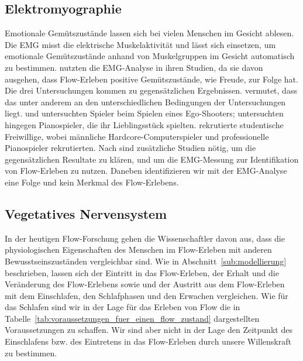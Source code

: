 \subsection{Elektromyographie}

Emotionale Gemütszustände lassen sich bei vielen Menschen im Gesicht ablesen. Die \ac{EMG} misst die elektrische Muskelaktivität und lässt sich einsetzen, um emotionale Gemütszustände anhand von Muskelgruppen im Gesicht automatisch zu bestimmen. \citet{Kivikangas2006, Nacke2008, deManzano2010} nutzten die \ac{EMG}-Analyse in ihren Studien, da sie davon ausgehen, dass Flow-Erleben positive Gemütszustände, wie Freude, zur Folge hat. Die drei Untersuchungen kommen zu gegensätzlichen Ergebnissen. \citet[vgl.][S.~153]{Peifer2012} vermutet, dass das unter anderem an den unterschiedlichen Bedingungen der Untersuchungen liegt. \citet{Kivikangas2006} und \citet{Nacke2008} untersuchten Spieler beim Spielen eines Ego-Shooters; \citet{deManzano2010} untersuchten hingegen Pianospieler, die ihr Lieblingsstück spielten. \citet{Kivikangas2006} rekrutierte studentische Freiwillige, wobei \citet{Nacke2008} männliche Hardcore-Computerspieler und \citet{deManzano2010} professionelle Pianospieler rekrutierten. Nach \citet[vgl.][S.~153]{Peifer2012} sind zusätzliche Studien nötig, um die gegensätzlichen Resultate zu klären, und um die \ac{EMG}-Messung zur Identifikation von Flow-Erleben zu nutzen. Daneben identifizieren wir mit der \ac{EMG}-Analyse eine Folge und kein Merkmal des Flow-Erlebens.

\subsection{Vegetatives Nervensystem}

In der heutigen Flow-Forschung gehen die Wissenschaftler davon aus, dass die physiologischen Eigenschaften des Menschen im Flow-Erleben mit anderen Bewusstseinszuständen vergleichbar sind. Wie in Abschnitt~\ref{sub:modellierung} beschrieben, lassen sich der Eintritt in das Flow-Erleben, der Erhalt und die Veränderung des Flow-Erlebens sowie und der Austritt aus dem Flow-Erleben mit dem Einschlafen, den Schlafphasen und den Erwachen vergleichen. Wie für das Schlafen sind wir in der Lage für das Erleben von Flow die in Tabelle~\ref{tab:voraussetzungen_fuer_einen_flow_zustand} dargestellten Voraussetzungen zu schaffen. Wir sind aber nicht in der Lage den Zeitpunkt des Einschlafens bzw. des Eintretens in das Flow-Erleben durch unsere Willenskraft zu bestimmen.

